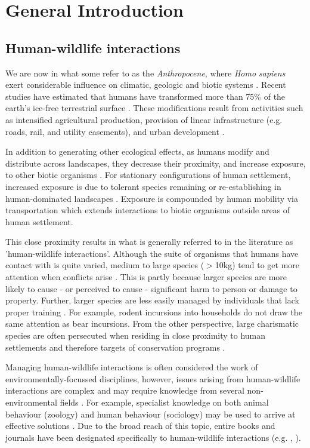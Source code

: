 \chapter{General Introduction}\label{sec:intro}
\newpage

\section{Human-wildlife interactions}

We are now in what some refer to as the \textit{Anthropocene}, where \textit{Homo sapiens} exert considerable influence on climatic, geologic and biotic systems \citep{crut06}. Recent studies have estimated that humans have transformed more than 75\% of the earth's ice-free terrestrial surface \citep{elli08}. These modifications result from activities such as intensified agricultural production, provision of linear infrastructure (e.g. roads, rail, and utility easements), and urban development \citep{vito97,sand02,fole05}.

In addition to generating other ecological effects, as humans modify and distribute across landscapes, they decrease their proximity, and increase exposure, to other biotic organisms \citep{}. For stationary configurations of human settlement, increased exposure is due to tolerant species remaining or re-establishing in human-dominated landscapes \citep{soul16}. Exposure is compounded by human mobility via transportation which extends interactions to biotic organisms outside areas of human settlement.

This close proximity results in what is generally referred to in the literature as 'human-wildlife interactions'. Although the suite of organisms that humans have contact with is quite varied, medium to large species ($>$10kg) tend to get more attention when conflicts arise \citep{seor16}. This is partly because larger species are more likely to cause - or perceived to cause - significant harm to person or damage to property. Further, larger species are less easily managed by individuals that lack proper training \citep{}. For example, rodent incursions into households do not draw the same attention as bear incursions. From the other perspective, large charismatic species are often persecuted when residing in close proximity to human settlements and therefore targets of conservation programs \citep{trev03}.

Managing human-wildlife interactions is often considered the work of environmentally-focussed disciplines, however, issues arising from human-wildlife interactions are complex and may require knowledge from several non-environmental fields \citep{}. For example, specialist knowledge on both animal behaviour (zoology) and human behaviour (sociology) may be used to arrive at effective solutions \citep{dick10}. Due to the broad reach of this topic, entire books and journals have been designated specifically to human-wildlife interactions (e.g. \cite{manf08}, \cite{}).

